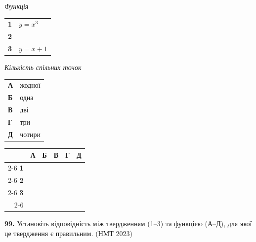 \documentclass[14pt]{extarticle}
\newcommand{\answerGrid}{
    \begingroup
    \renewcommand{\arraystretch}{1.3} 
    \setlength{\tabcolsep}{7pt} 
    \begin{tabular}{r|c|c|c|c|c|}
         \multicolumn{1}{c}{} & \multicolumn{1}{c}{\textbf{А}} & \multicolumn{1}{c}{\textbf{Б}} & \multicolumn{1}{c}{\textbf{В}} & \multicolumn{1}{c}{\textbf{Г}} & \multicolumn{1}{c}{\textbf{Д}} \\ \cline{2-6}
         \textbf{1} & & & & & \\ \cline{2-6}
         \textbf{2} & & & & & \\ \cline{2-6}
         \textbf{3} & & & & & \\ \cline{2-6}
    \end{tabular}
    \endgroup
}
\newcommand{\matchingLayout}[3]{
    \noindent
    \begin{minipage}[t]{0.40\textwidth}
       
        #1
    \end{minipage}%
    \hfill
    \begin{minipage}[t]{0.28\textwidth}
        
        #2
    \end{minipage}%
    \hfill
    \begin{minipage}[t]{0.30\textwidth}
        \vspace{0pt} %
        \begin{flushright}
        #3
        \end{flushright}
    \end{minipage}
}
\newcommand{\nmtyear}[1]{\hfill{\small\color{yearcolor}(НМТ #1)}}
\begin{document}
\vspace{0.3cm}

\matchingLayout{
    \textit{Функція} \par \vspace{0.2cm}
    \begin{tabular}{@{}p{0.5cm} l@{}}
    \textbf{1} & $y=x^3$ \\[0.4cm]
    \textbf{2} & \trigStyle{$y=\cos x$} \\[0.4cm]
    \textbf{3} & $y=x+1$ \\
    \end{tabular}
}{
    \textit{Кількість спільних точок} \par \vspace{0.2cm}
    \begin{tabular}{@{}p{0.5cm} l@{}}
    \textbf{А} & жодної \\[0.2cm]
    \textbf{Б} & одна \\[0.2cm]
    \textbf{В} & дві \\[0.2cm]
    \textbf{Г} & три \\[0.2cm]
    \textbf{Д} & чотири \\
    \end{tabular}
}{
    \answerGrid
}

\vspace{0.7cm}


\noindent\textbf{99.} Установіть відповідність між твердженням (1--3) та функцією (А--Д), для якої це твердження є правильним. \nmtyear{2023}


\vspace{0.3cm}
\end{document}

